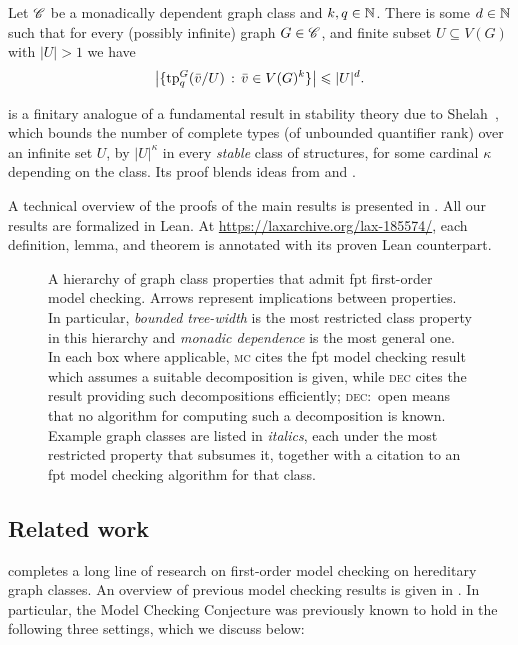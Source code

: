 \begin{theorem}\label{thm:intro-type-bound}
Let $\mathscr C$ be a monadically dependent graph class and $k,q\in\mathbb N$. There is some $d\in\mathbb N$ such that for every (possibly infinite) graph $G \in \mathscr C$,  and finite subset $U \subseteq V(G)$ with $|U|>1$
we have
\[
  \left|
    \{\textnormal{tp}^{G}_q(\bar v/U) \,:\, \bar v \in V(G)^k \}\right|
    \leqslant  |U|^d.
\]
\end{theorem}

 is a finitary analogue of a fundamental result in stability theory due to Shelah~\cite{Shelah1969}, which bounds the number of complete types (of unbounded quantifier rank) over an infinite set $U$, by $|U|^\kappa$ in every \emph{stable} class of structures, for some cardinal $\kappa$ depending on the class. 
Its proof blends ideas from \cite{number-of-types} and \cite{flippers}.

\medskip
A technical overview of the proofs of the main results is presented in . 
All our results are formalized in Lean. At \url{https://laxarchive.org/lax-185574/}, each definition, lemma, and theorem is annotated with its proven Lean counterpart.


\begin{figure}[htb]
  \centering
  
  \caption{A hierarchy of graph class properties that admit fpt first-order model checking.
    Arrows represent implications between properties.
    In particular, \emph{bounded tree-width} is the most restricted class property in this hierarchy and \emph{monadic dependence} is the most general one.
    In each box where applicable, \textsc{mc} cites the fpt model checking result which assumes a suitable decomposition is given, while \textsc{dec} cites the result providing such decompositions efficiently; \textsc{dec:}~open means that no algorithm for computing such a decomposition is known.
    Example graph classes are listed in \textcolor{black!60}{\emph{italics}}, each under the most restricted property that subsumes it, together with a citation to an fpt model checking algorithm for that class.}
  \label{fig:hierarchy}
\end{figure}

\subsection{Related work}
 completes a long line of research on first-order model checking on hereditary graph classes.
An overview of previous model checking results is given in . 
In particular, the Model Checking Conjecture was previously known to hold in the following three settings, which we discuss below:

